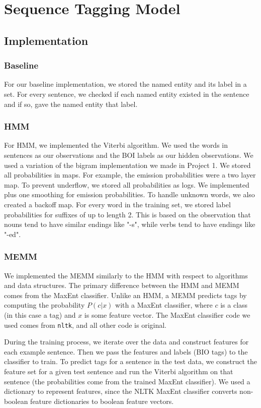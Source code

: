 \documentclass[12pt]{article}
\begin{document}
\maketitle

\section{Sequence Tagging Model}
\subsection{Implementation}
\subsubsection{Baseline}
For our baseline implementation, we stored the named entity and its label in a set. For every sentence, we checked if each named entity existed in the sentence and if so, gave the named entity that label.
\subsubsection{HMM}
For HMM, we implemented the Viterbi algorithm. We used the words in sentences as our observations and the BOI labels as our hidden observations. We used a variation of the bigram implementation we made in Project 1. We stored all probabilities in maps. For example, the emission probabilities were a two layer map. To prevent underflow, we stored all probabilities as logs. We implemented plus one smoothing for emission probabilities. To handle unknown words, we also created a backoff map. For every word in the training set, we stored label probabilities for suffixes of up to length 2. This is based on the observation that nouns tend to have similar endings like "-s", while verbs tend to have endings like "-ed".
\subsubsection{MEMM}
We implemented the MEMM similarly to the HMM with respect to algorithms and data structures. The primary difference between the HMM and MEMM comes from the MaxEnt classifier. Unlike an HMM, a MEMM predicts tags by computing the probability $P(c|x)$ with a MaxEnt classifier, where $c$ is a class (in this case a tag) and $x$ is some feature vector. The MaxEnt classifier code we used comes from {\tt nltk}, and all other code is original.

During the training process, we iterate over the data and construct features for each example sentence. Then we pass the features and labels (BIO tags) to the classifier to train. To predict tags for a sentence in the test data, we construct the feature set for a given test sentence and run the Viterbi algorithm on that sentence (the probabilities come from the trained MaxEnt classifier). We used a dictionary to represent features, since the NLTK MaxEnt classifier converts non-boolean feature dictionaries to boolean feature vectors.
\end{document}
